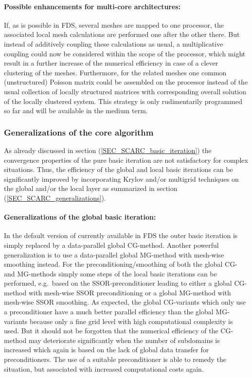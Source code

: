 \paragraph{Possible enhancements for multi-core architectures:}
If, as is possible in FDS, several meshes are mapped to one processor, the associated local mesh calculations are performed one after the other there. But instead of additively coupling these calculations as usual, a multiplicative coupling could now be considered within the scope of the processor, which might result in a further increase of the numerical efficiency in case of a clever clustering of the meshes. Furthermore, for the related meshes one common (unstructured) Poisson matrix could be assembled on the processor instead of the usual collection of locally structured matrices with corresponding overall solution of the locally clustered system. This strategy is only rudimentarily programmed so far and will be available in the medium term.



\subsubsection{Generalizations of the core algorithm}

As already discussed in section (\ref{SEC_SCARC_basic_iteration}) the convergence properties of the pure basic iteration are not satisfactory for complex situations. 
Thus, the efficiency of the global and local basic iterations can be significantly improved by incorporating Krylov and/or multigrid techniques on the global and/or the local layer as summarized in section (\ref{SEC_SCARC_generalizations}).

\paragraph{Generalizations of the global basic iteration:}
In the default version of \scarc{} currently available in FDS the outer basic iteration is simply replaced by a data-parallel global CG-method. 
Another powerful generalization is to use a data-parallel global MG-method with mesh-wise smoothing instead.
%
For the preconditioning/smoothing of both the global CG- and MG-methods  simply some steps of the local basic iterations can be performed, 
e.g.\ based on the SSOR-preconditioner leading to either a global CG-method with mesh-wise SSOR preconditioning or a global MG-method with mesh-wise SSOR smoothing.
%
As expected, the global CG-variants which only use a \ols{} preconditioner have a much better parallel efficiency than the global MG-variants because only a fine grid level with high computational complexity is used. But it should not be forgotten that the numerical efficiency of the CG-method may deteriorate significantly when the number of subdomains is increased 
which again is based on the lack of global data transfer for \ols{} preconditioners. The use of a suitable \tls{} preconditioner is able to remedy the situation, but associated with increased computational costs again.

